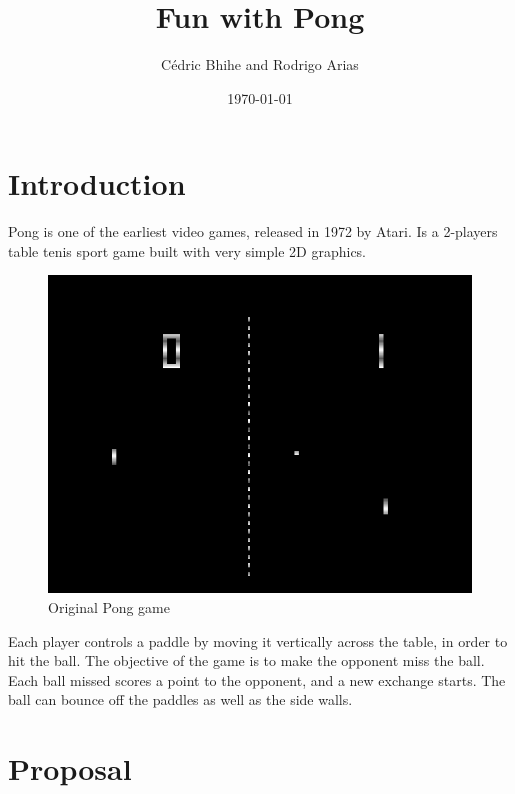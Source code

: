 \documentclass[a4paper,twocolumn]{article}
\title{Fun with Pong}
\author{Cédric Bhihe and Rodrigo Arias}
\date{\today}
\begin{document}
\maketitle

%
%

\section*{Introduction} %

Pong is one of the earliest video games, released in 1972 by Atari. Is a
2-players table tenis sport game built with very simple 2D graphics.

\begin{figure}[h]
	\centering
	\includegraphics[width=0.7\columnwidth]{pong.png}
	\caption{Original Pong game}
	\label{fig:pong}
\end{figure}

Each player controls a paddle by moving it vertically across the table, in order
to hit the ball. The objective of the game is to make the opponent miss the
ball. Each ball missed scores a point to the opponent, and a new exchange
starts. The ball can bounce off the paddles as well as the side walls.

\section*{Proposal} %
\end{document}
